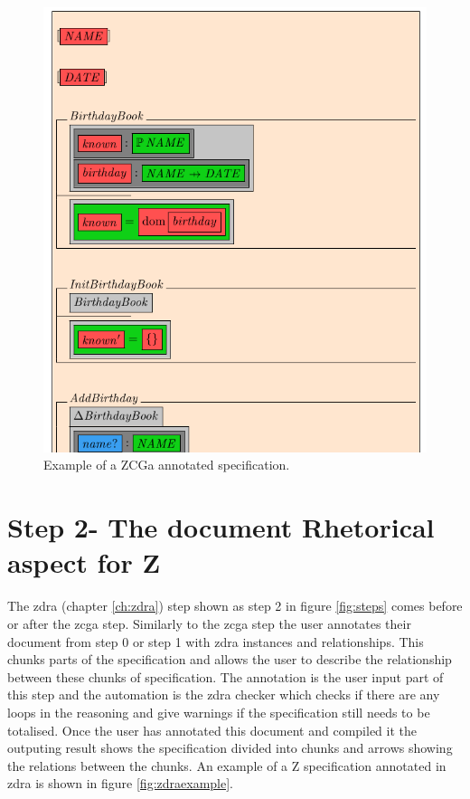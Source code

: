 \begin{figure}[H]
 \begin{center}
 \includegraphics [scale=0.25]{Figures/Design/zcgaexample.png}
 \caption{Example of a ZCGa annotated specification.}
 \label{fig:zcgaexample}
\end{center}
\end{figure} 

\section{Step 2- The document Rhetorical aspect for Z}

The \gls{zdra} (chapter \ref{ch:zdra}) step shown as step 2 in figure \ref{fig:steps} comes before or after the \gls{zcga} step. Similarly to the \gls{zcga} step the user annotates their document from step 0 or step 1 with \gls{zdra} instances and relationships. This chunks parts of the specification and allows the user to describe the relationship between these chunks of specification. The annotation is the user input part of this step and the automation is the \gls{zdra} checker which checks if there are any loops in the reasoning and give warnings if the specification still needs to be totalised. Once the user has annotated this document and compiled it the outputing result shows the specification divided into chunks and arrows showing the relations between the chunks. An example of a Z specification annotated in \gls{zdra} is shown in figure \ref{fig:zdraexample}.

